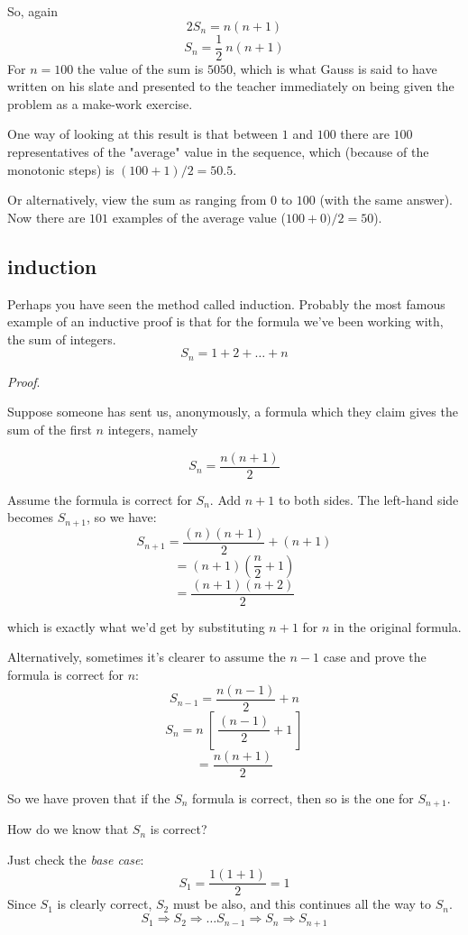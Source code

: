 \documentclass[11pt, oneside]{article}
\begin{document}
So, again
\[ 2S_n = n (n+1) \]
\[ S_n = \frac{1}{2} \ n (n+1) \]
For $n=100$ the value of the sum is $5050$, which is what Gauss is said to have written on his slate and presented to the teacher immediately on being given the problem as a make-work exercise.

One way of looking at this result is that between $1$ and $100$ there are $100$ representatives of the "average" value in the sequence, which (because of the monotonic steps) is $(100 + 1)/2 = 50.5$.  

Or alternatively, view the sum as ranging from $0$ to $100$ (with the same answer).  Now there are $101$ examples of the average value ($100 + 0)/2 = 50$).

\subsection*{induction}

Perhaps you have seen the method called induction.  Probably the most famous example of an inductive proof is that for the formula we've been working with, the sum of integers.
\[ S_n = 1 + 2 + \dots + n \]

\emph{Proof}.

Suppose someone has sent us, anonymously, a formula which they claim gives the sum of the first $n$ integers, namely 

\[ S_n = \frac{n (n + 1)}{2} \]

Assume the formula is correct for $S_n$.  Add $n+1$ to both sides.  The left-hand side becomes $S_{n+1}$, so we have:
\[ S_{n + 1} = \frac{(n)(n + 1)}{2} + (n+1) \]
\[ = (n+1)(\frac{n}{2} + 1) \]
\[ = \frac{(n + 1)(n + 2)}{2} \]

which is exactly what we'd get by substituting $n+1$ for $n$ in the original formula.

Alternatively, sometimes it's clearer to assume the $n-1$ case and prove the formula is correct for $n$:
\[ S_{n-1} = \frac{n(n-1)}{2} + n \]
\[ S_n =  n \ [ \ \frac{(n-1)}{2} + 1 \ ] \]
\[ = \frac{n(n + 1)}{2} \]

So we have proven that if the $S_n$ formula is correct, then so is the one for $S_{n+1}$.

How do we know that $S_n$ is correct?

Just check the \emph{base case}:
\[ S_1 = \frac{1(1 + 1)}{2} = 1 \]
Since $S_1$ is clearly correct, $S_2$ must be also, and this continues all the way to $S_{n}$.
\[ S_1 \Rightarrow S_2 \Rightarrow \dots S_{n-1} \Rightarrow S_n \Rightarrow S_{n+1} \]
\end{document}
